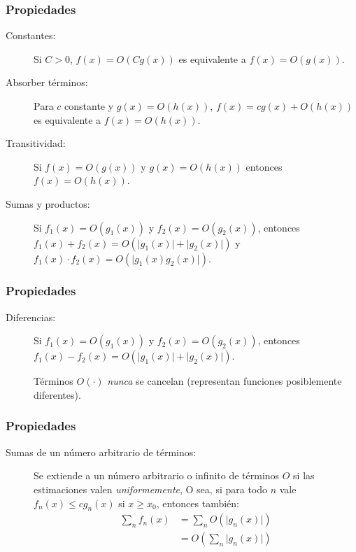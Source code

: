\documentclass[english, spanish, fleqn,%
hyperref = {colorlinks, urlcolor = blue}%
]{beamer}
\begin{document}
\begin{frame}
  \setcounter{beamerpauses}{2}
  \frametitle{Propiedades}

  \begin{description}
  \item[Constantes:]
    Si \(C > 0\),
    \(f(x) = O(C g(x))\) es equivalente a \(f(x) = O(g(x))\).
  \item[Absorber términos:]
    Para \(c\) constante y \(g(x) = O(h(x))\),
    \(f(x) = c g(x) + O(h(x))\)
    es equivalente a \(f(x) = O(h(x))\).
  \item[Transitividad:]
    Si \(f(x) = O(g(x))\) y \(g(x) = O(h(x))\)
    entonces \(f(x) = O(h(x))\).
  \item[Sumas y productos:]
    Si \(f_1(x) = O(g_1(x))\) y \(f_2(x) = O(g_2(x))\),
    entonces
     \(f_1(x) + f_2(x) = O(\lvert g_1(x) \rvert + \lvert g_2(x) \rvert)\)
    y
     \(f_1(x) \cdot f_2(x) = O(\lvert g_1(x) g_2(x) \rvert)\).
  \end{description}
\end{frame}

\begin{frame}
  \setcounter{beamerpauses}{2}
  \frametitle{Propiedades}

  \begin{description}
  \item[Diferencias:]
    Si \(f_1(x) = O(g_1(x))\) y \(f_2(x) = O(g_2(x))\),
    entonces
    \(f_1(x) - f_2(x) = O(\lvert g_1(x) \rvert + \lvert g_2(x) \rvert)\).

    Términos \(O(\cdot)\) \emph{nunca} se cancelan
    (representan funciones posiblemente diferentes).
  \end{description}
\end{frame}

\begin{frame}
  \setcounter{beamerpauses}{2}
  \frametitle{Propiedades}

  \begin{description}
  \item[Sumas de un número arbitrario de términos:]
    Se extiende a un número arbitrario
    o infinito de términos \(O\)
    si las estimaciones valen \emph{uniformemente},
    O sea,
    si para todo \(n\) vale \(f_n(x) \le c g_n(x)\) si \(x \ge x_0\),
    entonces también:
    \begin{align*}
      \sum_n f_n(x)
        &= \sum_n O(\lvert g_n(x) \rvert) \\
        &= O\left( \sum_n \lvert g_n(x) \rvert \right)
    \end{align*}
  \end{description}
\end{frame}
\end{document}
